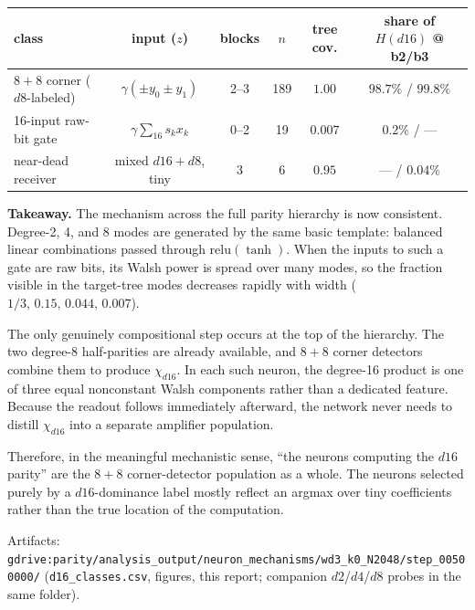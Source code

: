 \documentclass[10pt]{article}
\begin{document}
\begin{table}[h]\centering\small
\begin{tabular}{lccccc}
\toprule
class & input ($z$) & blocks & $n$ & tree cov. & share of $H(d16)$ @ b2/b3 \\
\midrule
$8{+}8$ corner ($d8$-labeled) & $\gamma(\pm y_0\pm y_1)$ & 2--3 & 189 & $1.00$ & $98.7\%$ / $99.8\%$ \\
16-input raw-bit gate & $\gamma\sum_{16}s_kx_k$ & 0--2 & 19 & $0.007$ & $0.2\%$ / --- \\
near-dead receiver & mixed $d16{+}d8$, tiny & 3 & 6 & $0.95$ & --- / $0.04\%$ \\
\bottomrule
\end{tabular}
\end{table}

\textbf{Takeaway.} The mechanism across the full parity hierarchy is now
consistent. Degree-2, 4, and 8 modes are generated by the same basic template:
balanced linear combinations passed through $\mathrm{relu}(\tanh)$. When the
inputs to such a gate are raw bits, its Walsh power is spread over many modes, so
the fraction visible in the target-tree modes decreases rapidly with width
($1/3,\,0.15,\,0.044,\,0.007$).

The only genuinely compositional step occurs at the top of the hierarchy. The two
degree-8 half-parities are already available, and $8{+}8$ corner detectors combine
them to produce $\chi_{d16}$. In each such neuron, the degree-16 product is one of
three equal nonconstant Walsh components rather than a dedicated feature. Because
the readout follows immediately afterward, the network never needs to distill
$\chi_{d16}$ into a separate amplifier population.

Therefore, in the meaningful mechanistic sense, ``the neurons computing the
$d16$ parity'' are the $8{+}8$ corner-detector population as a whole. The neurons
selected purely by a $d16$-dominance label mostly reflect an argmax over tiny
coefficients rather than the true location of the computation.

\vfill\footnotesize
Artifacts: \texttt{gdrive:parity/analysis\_output/neuron\_mechanisms/wd3\_k0\_N2048/step\_00500000/}
(\texttt{d16\_classes.csv}, figures, this report; companion $d2$/$d4$/$d8$ probes in
the same folder).
\end{document}
